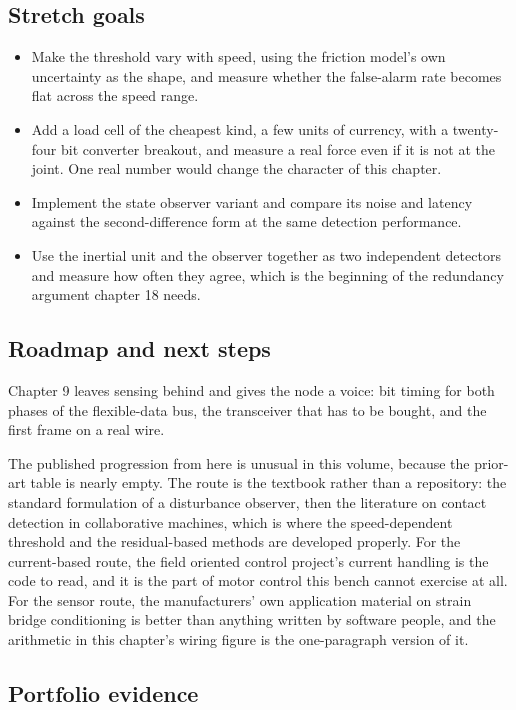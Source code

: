 \subsection*{Stretch goals}

\begin{itemize}
\item Make the threshold vary with speed, using the friction model's own
uncertainty as the shape, and measure whether the false-alarm rate becomes flat
across the speed range.
\item Add a load cell of the cheapest kind, a few units of currency, with a
twenty-four bit converter breakout, and measure a real force even if it is not
at the joint. One real number would change the character of this chapter.
\item Implement the state observer variant and compare its noise and latency
against the second-difference form at the same detection performance.
\item Use the inertial unit and the observer together as two independent
detectors and measure how often they agree, which is the beginning of the
redundancy argument chapter 18 needs.
\end{itemize}

\subsection*{Roadmap and next steps}

Chapter 9 leaves sensing behind and gives the node a voice: bit timing for both
phases of the flexible-data bus, the transceiver that has to be bought, and the
first frame on a real wire.

The published progression from here is unusual in this volume, because the
prior-art table is nearly empty. The route is the textbook rather than a
repository: the standard formulation of a disturbance observer, then the
literature on contact detection in collaborative machines, which is where the
speed-dependent threshold and the residual-based methods are developed properly.
For the current-based route, the field oriented control project's current
handling is the code to read, and it is the part of motor control this bench
cannot exercise at all. For the sensor route, the manufacturers' own application
material on strain bridge conditioning is better than anything written by
software people, and the arithmetic in this chapter's wiring figure is the
one-paragraph version of it.

\subsection*{Portfolio evidence}

